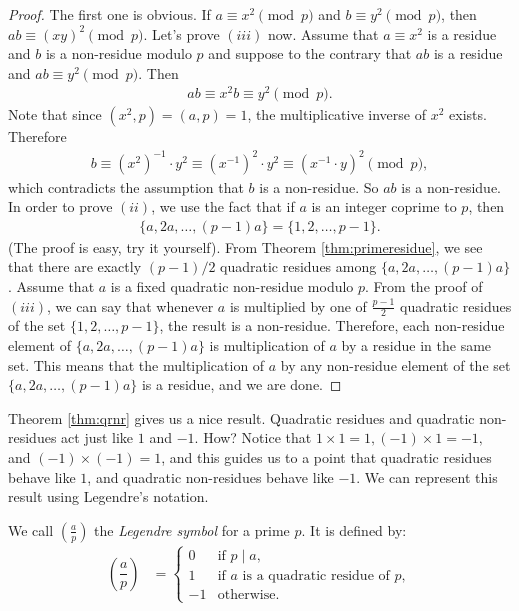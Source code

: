 \documentclass[main.tex]{subfile}
\begin{document}
	\begin{proof}
		The first one is obvious. If $a \equiv x^2 \pmod p$ and $b\equiv y^2 \pmod p$, then $ab \equiv (xy)^2 \pmod p$. 
		Let's prove $(iii)$ now. Assume that $a \equiv x^2$ is a residue and $b$ is a non-residue modulo $p$ and suppose to the contrary that $ab$ is a residue and $ab \equiv y^2 \pmod p$. Then
		\begin{align*}
			ab \equiv x^2b \equiv y^2 \pmod p.
		\end{align*}
		Note that since $(x^2,p)=(a,p)=1$, the multiplicative inverse of $x^2$ exists. Therefore
		\begin{align*}
			b \equiv (x^2)^{-1} \cdot y^2 \equiv (x^{-1})^2 \cdot y^2 \equiv (x^{-1} \cdot y)^2 \pmod p,
		\end{align*}
		which contradicts the assumption that $b$ is a non-residue. So $ab$ is a non-residue.
		In order to prove $(ii)$, we use the fact that if $a$ is an integer coprime to $p$, then
		\begin{align*}
			\{a,2a,\ldots,(p-1)a\} = \{ 1,2,\ldots,p-1\}.
		\end{align*}
		(The proof is easy, try it yourself). From Theorem \ref{thm:primeresidue}, we see that there are exactly   $(p-1)/2$ quadratic residues among $\{a,2a,\ldots,(p-1)a\}$. Assume that $a$ is a fixed quadratic non-residue modulo $p$. From the proof of $(iii)$, we can say that whenever $a$ is multiplied by one of $\displaystyle \frac{p-1}{2}$ quadratic residues of the set $\{ 1,2,\ldots,p-1\}$, the result is a non-residue. Therefore, each non-residue element of $\{a,2a,\ldots,(p-1)a\}$ is multiplication of $a$ by a residue in the same set. This means that the multiplication of $a$ by any non-residue element of the set $\{a,2a,\ldots,(p-1)a\}$ is a residue, and we are done.
	\end{proof}
	
	Theorem \ref{thm:qrnr} gives us a nice result. Quadratic residues and quadratic non-residues act just like $1$ and $-1$. How? Notice that $1 \times 1 =1, (-1) \times 1 =-1,$ and $(-1) \times (-1)=1$, and this guides us to a point that quadratic residues behave like $1$, and quadratic non-residues behave like $-1$. %
	We can represent this result using Legendre's notation.
	
	\begin{definition}
		We call $\left(\frac{a}{p}\right)$ the {\it Legendre symbol} for a prime $p$. It is defined by:
		\begin{align*}
			\left(\dfrac{a}{p}\right) 
			& = 
			\begin{cases}
				0 & \mbox{if }p\mid a,\\
				1 &\mbox{if }a\mbox{ is a quadratic residue of }p,\\
				-1 &\mbox{otherwise}.
			\end{cases}
		\end{align*}
		
	\end{definition}
	
\end{document}
